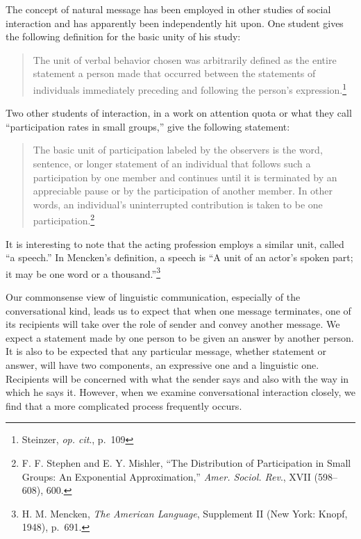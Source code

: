 \documentclass[openany,nobib]{tufte-book}
\begin{document}
The concept of natural message has been employed in other studies of
social interaction and has apparently been independently hit upon. One
student gives the following definition for the basic unity of his study:

\begin{quote}
The unit of verbal behavior chosen was arbitrarily defined as the entire
statement a person made that occurred between the statements of
individuals immediately preceding and following the person's
expression.\footnote{Steinzer, \emph{op. cit}., p.~109}
\end{quote}

\noindent Two other students of interaction, in a work on attention quota or what
they call ``participation rates in small groups,'' give the following
statement:

\begin{quote}
The basic unit of participation labeled by the observers is the word,
sentence, or longer statement of an individual that follows such a
participation by one member and continues until it is terminated by an
appreciable pause or by the participation of another member. In other
words, an individual's uninterrupted contribution is taken to be one
participation.\footnote{F. F. Stephen and E. Y. Mishler, ``The
  Distribution of Participation in Small Groups: An Exponential
  Approximation,'' \emph{Amer. Sociol. Rev}., XVII (598--608), 600.}
\end{quote}

\noindent It is interesting to note that the acting profession employs a similar
unit, called ``a speech.'' In Mencken's definition, a speech is ``A unit
of an actor's spoken part; it may be one word or a
thousand.''\footnote{H. M. Mencken, \emph{The American Language},
  Supplement II (New York: Knopf, 1948), p.~691.}

Our commonsense view of linguistic communication, especially of the
conversational kind, leads us to expect that when one message
terminates, one of its recipients will take over the role of sender and
convey another message. We expect a statement made by one person to be
given an answer by another person. It is also to be expected that any
particular message, whether statement or answer, will have two
components, an expressive one and a linguistic one. Recipients will be
concerned with what the sender says and also with the way in which he
says it. However, when we examine conversational interaction closely, we
find that a more complicated process frequently occurs.
\end{document}
